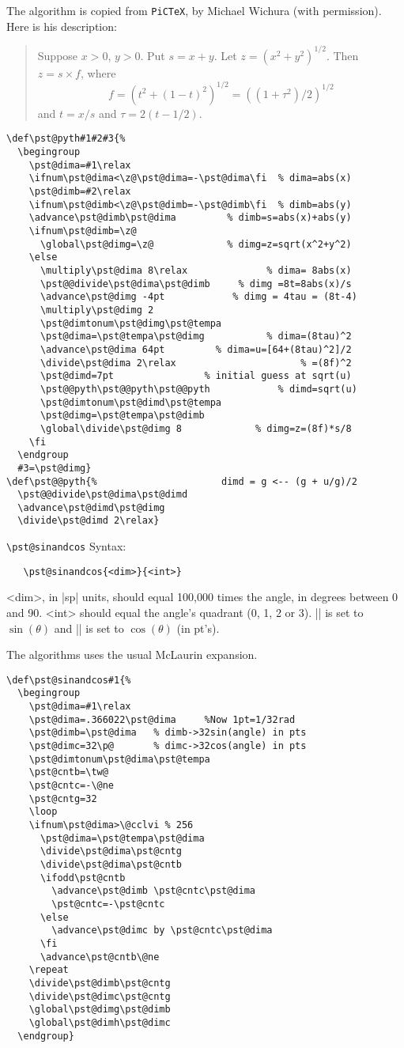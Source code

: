 \documentclass[11pt,english,BCOR10mm,DIV12,bibliography=totoc,parskip=false,smallheadings
    headexclude,footexclude,oneside,dvipsnames,svgnames]{pst-doc}
\def\PiCTeX{\texttt{PiCTeX}}
\begin{document}
 The algorithm is copied from \PiCTeX, by Michael Wichura (with permission).
 Here is his description:
 \begin{quote}
 Suppose $x>0$, $y>0$. Put $s = x+y$. Let $z = (x^2+y^2)^{1/2}$. Then $z =
 s\times f$, where
 \[
   f = (t^2 + (1-t)^2)^{1/2} = ((1+\tau^2)/2)^{1/2}
 \]
 and $t = x/s$  and  $\tau = 2(t-1/2)$.
 \end{quote}
    \begin{lstlisting}
\def\pst@pyth#1#2#3{%
  \begingroup
    \pst@dima=#1\relax
    \ifnum\pst@dima<\z@\pst@dima=-\pst@dima\fi  % dima=abs(x)
    \pst@dimb=#2\relax
    \ifnum\pst@dimb<\z@\pst@dimb=-\pst@dimb\fi  % dimb=abs(y)
    \advance\pst@dimb\pst@dima         % dimb=s=abs(x)+abs(y)
    \ifnum\pst@dimb=\z@
      \global\pst@dimg=\z@             % dimg=z=sqrt(x^2+y^2)
    \else
      \multiply\pst@dima 8\relax              % dima= 8abs(x)
      \pst@@divide\pst@dima\pst@dimb     % dimg =8t=8abs(x)/s
      \advance\pst@dimg -4pt            % dimg = 4tau = (8t-4)
      \multiply\pst@dimg 2
      \pst@dimtonum\pst@dimg\pst@tempa
      \pst@dima=\pst@tempa\pst@dimg           % dima=(8tau)^2
      \advance\pst@dima 64pt         % dima=u=[64+(8tau)^2]/2
      \divide\pst@dima 2\relax                      % =(8f)^2
      \pst@dimd=7pt                % initial guess at sqrt(u)
      \pst@@pyth\pst@@pyth\pst@@pyth            % dimd=sqrt(u)
      \pst@dimtonum\pst@dimd\pst@tempa
      \pst@dimg=\pst@tempa\pst@dimb
      \global\divide\pst@dimg 8             % dimg=z=(8f)*s/8
    \fi
  \endgroup
  #3=\pst@dimg}
\def\pst@@pyth{%                      dimd = g <-- (g + u/g)/2
  \pst@@divide\pst@dima\pst@dimd
  \advance\pst@dimd\pst@dimg
  \divide\pst@dimd 2\relax}
    \end{lstlisting}


 {\verb+\pst@sinandcos+}
 Syntax:
 \begin{verbatim}
   \pst@sinandcos{<dim>}{<int>}
 \end{verbatim}
 <dim>, in |sp| units, should equal 100,000 times the angle, in degrees
 between 0 and 90. <int> should equal the angle's quadrant (0, 1, 2 or 3).
 |\pst@dimg| is set to $\sin(\theta)$ and |\pst@dimh| is set to
 $\cos(\theta)$ (in pt's).

 The algorithms uses the usual McLaurin expansion.
    \begin{lstlisting}
\def\pst@sinandcos#1{%
  \begingroup
    \pst@dima=#1\relax
    \pst@dima=.366022\pst@dima     %Now 1pt=1/32rad
    \pst@dimb=\pst@dima   % dimb->32sin(angle) in pts
    \pst@dimc=32\p@       % dimc->32cos(angle) in pts
    \pst@dimtonum\pst@dima\pst@tempa
    \pst@cntb=\tw@
    \pst@cntc=-\@ne
    \pst@cntg=32
    \loop
    \ifnum\pst@dima>\@cclvi % 256
      \pst@dima=\pst@tempa\pst@dima
      \divide\pst@dima\pst@cntg
      \divide\pst@dima\pst@cntb
      \ifodd\pst@cntb
        \advance\pst@dimb \pst@cntc\pst@dima
        \pst@cntc=-\pst@cntc
      \else
        \advance\pst@dimc by \pst@cntc\pst@dima
      \fi
      \advance\pst@cntb\@ne
    \repeat
    \divide\pst@dimb\pst@cntg
    \divide\pst@dimc\pst@cntg
    \global\pst@dimg\pst@dimb
    \global\pst@dimh\pst@dimc
  \endgroup}
    \end{lstlisting}
\end{document}
